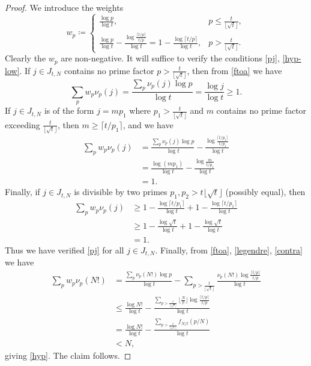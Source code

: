 \documentclass[10pt,a4paper,reqno]{amsart}
\numberwithin{equation}{section}
\theoremstyle{plain}
\theoremstyle{definition}
\begin{document}
\begin{proof} We introduce the weights
  $$ 
w_p \coloneqq  \begin{cases} 
  \frac{\log p}{\log t}, & p  \leq \frac{t}{\lfloor \sqrt{t} \rfloor}, \\
  \frac{\log p}{\log t} - \frac{\log \frac{\lceil t/p \rceil}{t/p}}{\log t} = 1 - \frac{\log \lceil t/p \rceil}{\log t}, & p  > \frac{t}{\lfloor \sqrt{t} \rfloor}.
\end{cases}
$$
Clearly the $w_p$ are non-negative.  It will suffice to verify the conditions \eqref{pj}, \eqref{hyp-low}.  If $j \in J_{t,N}$ contains no prime factor $p > \frac{t}{\lfloor \sqrt{t} \rfloor}$, then from \eqref{ftoa} we have
$$ \sum_p w_p \nu_p(j) = \frac{\sum_p \nu_p(j) \log p}{\log t} = \frac{\log j}{\log t} \geq 1.$$
If $j \in J_{t,N}$ is of the form $j = mp_1$ where $p_1 > \frac{t}{\lfloor \sqrt{t} \rfloor}$ and $m$ contains no prime factor exceeding $\frac{t}{\lfloor \sqrt{t} \rfloor}$, then $m \geq \lceil t/p_1 \rceil$, and we have
\begin{align*}
\sum_p w_p \nu_p(j) &= \frac{\sum_p \nu_p(j) \log p}{\log t}
- \frac{\log \frac{\lceil t/p_1 \rceil}{t/p_1}}{\log t}\\
&= \frac{\log(mp_1)}{\log t} -  \frac{\log \frac{m}{t/p_1}}{\log t} \\
&= 1.
\end{align*}
Finally, if $j \in J_{t,N}$ is divisible by two primes $p_1, p_2 > {t}{\lfloor \sqrt{t} \rfloor}$ (possibly equal), then
\begin{align*}
  \sum_p w_p \nu_p(j) &\geq
  1 - \frac{\log \lceil t/p_1 \rceil}{\log t} + 1 - \frac{\log \lceil t/p_1 \rceil}{\log t} \\
  &\geq
  1 - \frac{\log \sqrt{t}}{\log t} + 1 - \frac{\log \sqrt{t}}{\log t} \\
  &= 1.
\end{align*}
Thus we have verified \eqref{pj} for all $j \in J_{t,N}$.  Finally, from \eqref{ftoa}, \eqref{legendre}, \eqref{contra} we have
\begin{align*}
  \sum_p w_p \nu_p(N!) &= \frac{\sum_p \nu_p(N!) \log p}{\log t} - \sum_{p > \frac{t}{\lfloor \sqrt{t} \rfloor}} \frac{\nu_p(N!) \log \frac{\lceil t/p \rceil}{t/p}}{\log t} \\
  &\leq \frac{\log N!}{\log t} -  \frac{\sum_{p > \frac{t}{\lfloor \sqrt{t} \rfloor}} \lfloor \frac{N}{p} \rfloor \log \frac{\lceil t/p \rceil}{t/p}}{\log t}\\
  &= \frac{\log N!}{\log t} - \frac{\sum_{p > \frac{t}{\lfloor \sqrt{t} \rfloor}} f_{N/t}(p/N)}{\log t} \\
  &< N,
\end{align*}
giving \eqref{hyp}.  The claim follows.
\end{proof}
\end{document}
